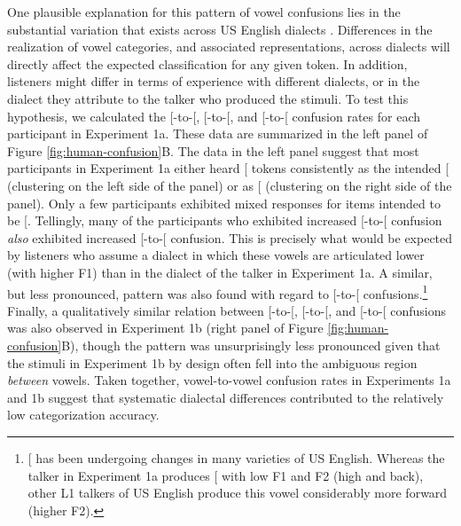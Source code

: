 \documentclass[preprint]{JASA}
\begin{document}
One plausible explanation for this pattern of vowel confusions lies in the substantial variation that exists across US English dialects \citep{atlasnae}. Differences in the realization of vowel categories, and associated representations, across dialects will directly affect the expected classification for any given token. In addition, listeners might differ in terms of experience with different dialects, or in the dialect they attribute to the talker who produced the stimuli. To test this hypothesis, we calculated the {[}\ipatext{ɪ}{]}-to-{[}\ipatext{ɛ}{]}, {[}\ipatext{ɛ}{]}-to-{[}\ipatext{æ}{]}, and {[}\ipatext{u}{]}-to-{[}\ipatext{ʊ}{]} confusion rates for each participant in Experiment 1a. These data are summarized in the left panel of Figure \ref{fig:human-confusion}B. The data in the left panel suggest that most participants in Experiment 1a either heard {[}\ipatext{ɪ}{]} tokens consistently as the intended {[}\ipatext{ɪ}{]} (clustering on the left side of the panel) or as {[}\ipatext{ɛ}{]} (clustering on the right side of the panel). Only a few participants exhibited mixed responses for items intended to be {[}\ipatext{ɪ}{]}. Tellingly, many of the participants who exhibited increased {[}\ipatext{ɪ}{]}-to-{[}\ipatext{ɛ}{]} confusion \emph{also} exhibited increased {[}\ipatext{ɛ}{]}-to-{[}\ipatext{æ}{]} confusion. This is precisely what would be expected by listeners who assume a dialect in which these vowels are articulated lower (with higher F1) than in the dialect of the talker in Experiment 1a. A similar, but less pronounced, pattern was also found with regard to {[}\ipatext{u}{]}-to-{[}\ipatext{ʊ}{]} confusions.\footnote{{[}\ipatext{u}{]} has been undergoing changes in many varieties of US English. Whereas the talker in Experiment 1a produces {[}\ipatext{u}{]} with low F1 and F2 (high and back), other L1 talkers of US English produce this vowel considerably more forward (higher F2).} Finally, a qualitatively similar relation between {[}\ipatext{ɪ}{]}-to-{[}\ipatext{ɛ}{]}, {[}\ipatext{ɛ}{]}-to-{[}\ipatext{æ}{]}, and {[}\ipatext{u}{]}-to-{[}\ipatext{ʊ}{]} confusions was also observed in Experiment 1b (right panel of Figure \ref{fig:human-confusion}B), though the pattern was unsurprisingly less pronounced given that the stimuli in Experiment 1b by design often fell into the ambiguous region \emph{between} vowels. Taken together, vowel-to-vowel confusion rates in Experiments 1a and 1b suggest that systematic dialectal differences contributed to the relatively low categorization accuracy.
\end{document}
